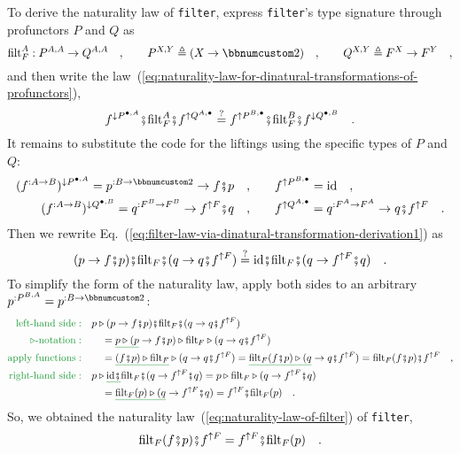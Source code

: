 To derive the naturality law of \lstinline!filter!, express \lstinline!filter!'s
type signature through profunctors $P$ and $Q$ as
\[
\text{filt}_{F}^{A}:P^{A,A}\rightarrow Q^{A,A}\quad,\quad\quad P^{X,Y}\triangleq(X\rightarrow\bbnum 2)\quad,\quad\quad Q^{X,Y}\triangleq F^{X}\rightarrow F^{Y}\quad,
\]
and then write the law~(\ref{eq:naturality-law-for-dinatural-transformations-of-profunctors}),
\begin{equation}
f^{\downarrow P^{\bullet,A}}\bef\text{filt}_{F}^{A}\bef f^{\uparrow Q^{A,\bullet}}\overset{?}{=}f^{\uparrow P^{B,\bullet}}\bef\text{filt}_{F}^{B}\bef f^{\downarrow Q^{\bullet,B}}\quad.\label{eq:filter-law-via-dinatural-transformation-derivation1}
\end{equation}
It remains to substitute the code for the liftings using the specific
types of $P$ and $Q$:
\begin{align*}
(f^{:A\rightarrow B})^{\downarrow P^{\bullet,A}}=p^{:B\rightarrow\bbnum 2}\rightarrow f\bef p\quad, & \quad\quad f^{\uparrow P^{B,\bullet}}=\text{id}\quad,\\
(f^{:A\rightarrow B})^{\downarrow Q^{\bullet,B}}=q^{:F^{B}\rightarrow F^{B}}\rightarrow f^{\uparrow F}\bef q\quad, & \quad\quad f^{\uparrow Q^{A,\bullet}}=q^{:F^{A}\rightarrow F^{A}}\rightarrow q\bef f^{\uparrow F}\quad.
\end{align*}
Then we rewrite Eq.~(\ref{eq:filter-law-via-dinatural-transformation-derivation1})
as
\[
(p\rightarrow f\bef p)\bef\text{filt}_{F}\bef(q\rightarrow q\bef f^{\uparrow F})\overset{?}{=}\text{id}\bef\text{filt}_{F}\bef(q\rightarrow f^{\uparrow F}\bef q)\quad.
\]
To simplify the form of the naturality law, apply both sides to an
arbitrary $p^{:P^{B,A}}=p^{:B\rightarrow\bbnum 2}$:
\begin{align*}
{\color{greenunder}\text{left-hand side}:}\quad & p\triangleright(p\rightarrow f\bef p)\bef\text{filt}_{F}\bef(q\rightarrow q\bef f^{\uparrow F})\\
{\color{greenunder}\triangleright\text{-notation}:}\quad & \quad=\gunderline{p\triangleright(p}\rightarrow f\bef p)\triangleright\text{filt}_{F}\triangleright(q\rightarrow q\bef f^{\uparrow F})\\
{\color{greenunder}\text{apply functions}:}\quad & \quad=\gunderline{(f\bef p)\triangleright\text{filt}_{F}}\triangleright(q\rightarrow q\bef f^{\uparrow F})=\gunderline{\text{filt}_{F}(f\bef p)\triangleright(q}\rightarrow q\bef f^{\uparrow F})=\text{filt}_{F}(f\bef p)\bef f^{\uparrow F}\quad,\\
{\color{greenunder}\text{right-hand side}:}\quad & p\triangleright\gunderline{\text{id}\bef}\text{filt}_{F}\bef(q\rightarrow f^{\uparrow F}\bef q)=p\triangleright\text{filt}_{F}\triangleright(q\rightarrow f^{\uparrow F}\bef q)\\
 & \quad=\gunderline{\text{filt}_{F}(p)\triangleright(q}\rightarrow f^{\uparrow F}\bef q)=f^{\uparrow F}\bef\text{filt}_{F}(p)\quad.
\end{align*}
So, we obtained the naturality law~(\ref{eq:naturality-law-of-filter})
of \lstinline!filter!,
\[
\text{filt}_{F}(f\bef p)\bef f^{\uparrow F}=f^{\uparrow F}\bef\text{filt}_{F}(p)\quad.
\]


